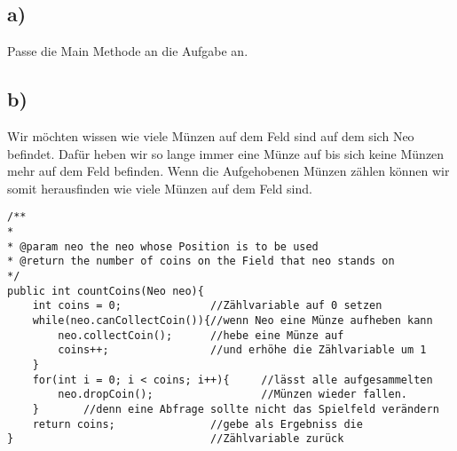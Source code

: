 	\subsection*{a)}
		Passe die Main Methode an die Aufgabe an.
	\subsection*{b)}
		Wir möchten wissen wie viele Münzen auf dem Feld sind auf dem sich Neo befindet. Dafür heben wir so lange immer eine Münze auf bis sich keine Münzen mehr auf dem Feld befinden. Wenn die Aufgehobenen Münzen zählen können wir somit 				herausfinden wie viele Münzen auf dem Feld sind.
		\begin{lstlisting}
/**
*
* @param neo the neo whose Position is to be used
* @return the number of coins on the Field that neo stands on
*/
public int countCoins(Neo neo){
	int coins = 0;				//Zählvariable auf 0 setzen
	while(neo.canCollectCoin()){//wenn Neo eine Münze aufheben kann
		neo.collectCoin();		//hebe eine Münze auf
		coins++;				//und erhöhe die Zählvariable um 1
	}
	for(int i = 0; i < coins; i++){ 	//lässt alle aufgesammelten
		neo.dropCoin();					//Münzen wieder fallen.
	}		//denn eine Abfrage sollte nicht das Spielfeld verändern
	return coins;				//gebe als Ergebniss die 
}								//Zählvariable zurück
\end{lstlisting}

